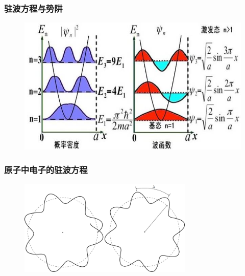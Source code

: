 \frame
{
	\frametitle{驻波方程与势阱}
\begin{figure}[h!]
\centering
\vspace{-0.5pt}
\includegraphics[height=0.46\textwidth,width=1.0\textwidth,viewport=0 0 650 390,clip]{Figures/Standing_wave_Energy.jpeg}
\label{Standing_Wave_3}
\end{figure}
}

\frame
{
	\frametitle{原子中电子的驻波方程}
\begin{figure}[h!]
	\vspace{-10.5pt}
\centering
\includegraphics[height=0.38\textwidth,width=0.74\textwidth,viewport=0 0 840 440,clip]{Figures/Standing_wave-atom.png}
\vskip 2pt
\label{Atomic-electron_Standing_wave}
\end{figure}
}

